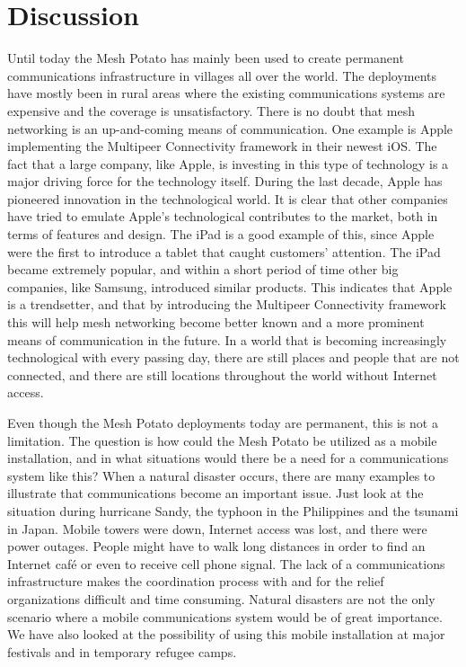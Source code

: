 \chapter{Discussion}
\label{chp:discussion} 

Until today the Mesh Potato has mainly been used to create permanent communications infrastructure in villages all over the world. The deployments have mostly been in rural areas where the existing communications systems are expensive and the coverage is unsatisfactory. There is no doubt that mesh networking is an up-and-coming means of communication. One example is Apple implementing the Multipeer Connectivity framework in their newest iOS. The fact that a large company, like Apple, is investing in this type of technology is a major driving force for the technology itself. During the last decade, Apple has pioneered innovation in the technological world. It is clear that other companies have tried to emulate Apple's technological contributes to the market, both in terms of features and design. The iPad is a good example of this, since Apple were the first to introduce a tablet that caught customers' attention. The iPad became extremely popular, and within a short period of time other big companies, like Samsung, introduced similar products. This indicates that Apple is a trendsetter, and that by introducing the Multipeer Connectivity framework this will help mesh networking become better known and a more prominent means of communication in the future. In a world that is becoming increasingly technological with every passing day, there are still places and people that are not connected, and there are still locations throughout the world without Internet access. 

Even though the Mesh Potato deployments today are permanent, this is not a limitation. The question is how could the Mesh Potato be utilized as a mobile installation, and in what situations would there be a need for a communications system like this? When a natural disaster occurs, there are many examples to illustrate that communications become an important issue. Just look at the situation during hurricane Sandy, the typhoon in the Philippines and the tsunami in Japan. Mobile towers were down, Internet access was lost, and there were power outages. People might have to walk long distances in order to find an Internet café or even to receive cell phone signal. The lack of a communications infrastructure makes the coordination process with and for the relief organizations difficult and time consuming. Natural disasters are not the only scenario where a mobile communications system would be of great importance. We have also looked at the possibility of using this mobile installation at major festivals and in temporary refugee camps. 

